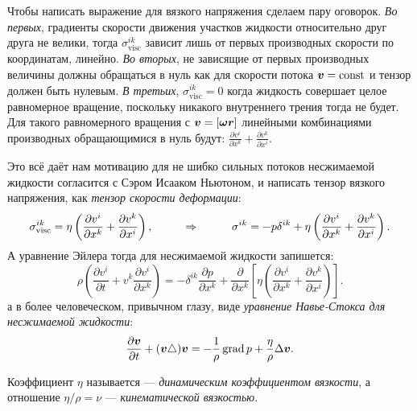 Чтобы написать выражение для вязкого напряжения сделаем пару оговорок. 
\textit{Во первых}, градиенты скорости движения участков жидкости относительно друг друга не велики, тогда $\sigma^{i k}_{\text{visc}}$ зависит лишь от первых производных скорости по координатам, линейно. \textit{Во вторых}, не зависящие от первых производных величины должны обращаться в нуль как для скорости потока $\mbox{\boldmath $v$} = \text{const}$ и тензор должен быть нулевым. \textit{В третьих}, $\sigma^{i k}_{\text{visc}} = 0$ когда жидкость совершает целое равномерное вращение, поскольку никакого внутреннего трения тогда не будет.
Для такого равномерного вращения с $\mbox{\boldmath $v$} = [\mbox{\boldmath $\omega$} \mbox{\boldmath $r$}]$ линейными комбинациями производных обращающимися в нуль будут: $\frac{\partial v^i}{\partial x^k} + \frac{\partial v^k}{\partial x^i}$.

Это всё даёт нам мотивацию для не шибко сильных потоков несжимаемой жидкости согласится с Сэром Исааком Ньютоном, и написать тензор вязкого напряжения, как \textit{тензор скорости деформации}:
\begin{equation*}
	\sigma^{i k}_{\text{visc}} = \eta \left(\frac{\partial v^i}{\partial x^k} + \frac{\partial v^k}{\partial x^i}\right),
	\hspace*{1 cm}
	\Rightarrow
	\hspace*{1 cm}
	\sigma^{i k} = - p \delta^{i k} + \eta \left(\frac{\partial v^i}{\partial x^k} + \frac{\partial v^k}{\partial x^i}\right).
\end{equation*}
А уравнение Эйлера тогда для несжимаемой жидкости запишется:
\begin{equation*}
	\rho \left(\frac{\partial v^i}{\partial t} + v^k \frac{\partial v^i}{\partial x^k}\right)
	=
	- \delta^{i k} \frac{\partial p}{\partial x^k} + \frac{\partial}{\partial x^k} \left[\eta \left(\frac{\partial v^i}{\partial x^k} + \frac{\partial v^k}{\partial x^i}\right)\right].
\end{equation*}
а в более человеческом, привычном глазу, виде \textit{уравнение Навье-Стокса для несжимаемой жидкости}:
\begin{equation*}
	\frac{\partial \mbox{\boldmath $v$}}{\partial t} + (\mbox{\boldmath $v$} \triangle) \mbox{\boldmath $v$} = - \frac{1}{\rho} \mathop{\mathrm{grad}}\nolimits p + \frac{\eta}{\rho} \Delta \mbox{\boldmath $v$}.
\end{equation*}
\begin{to_def}
	Коэффициент $\eta$ называется --- \textit{динамическим коэффициентом вязкости}, а отношение $\eta/\rho = \nu$ --- \textit{кинематической вязкостью}.
\end{to_def}
